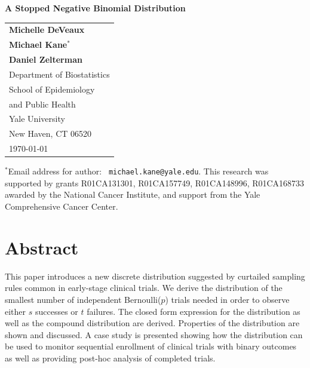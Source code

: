 \documentclass[12pt]{article}         %
\begin{document}
\thispagestyle{empty}
\begin{center}
\vspace*{\fill}

{\Large\bf A Stopped Negative Binomial Distribution} \\ [1ex]

\vspace*{1.25in}
\begin{tabular}{l} 
 {\bf Michelle DeVeaux} \\
 {\bf Michael Kane${}^*$} \\
 {\bf Daniel Zelterman}  \\[.1in]

 Department of Biostatistics \\
 School of Epidemiology  \\
 \hspace*{.15in} and Public Health  \\
 Yale University       \\
 New Haven, CT  06520  \\[.2in]

\today
\end{tabular}
\end{center}

\vspace*{\fill}

\noindent${}^*$Email address for author: {\tt
michael.kane@yale.edu}.  This research was supported by grants 
	R01CA131301, R01CA157749, R01CA148996, R01CA168733 awarded by the National Cancer Institute, and support from the Yale Comprehensive Cancer Center.


\newpage
\thispagestyle{empty}

\section*    {\bf   Abstract}

This paper introduces a new discrete distribution suggested by curtailed sampling rules common in early-stage clinical trials. We derive the distribution of the smallest number of independent Bernoulli($p$) trials needed in order to observe either $s$ successes or $t$ failures. The closed form expression for the distribution as well as the compound distribution are derived. Properties of the distribution are shown and discussed. A case study is presented showing how the distribution can be used to monitor sequential enrollment of clinical trials with binary outcomes as well as providing post-hoc analysis of completed trials.
\end{document}
